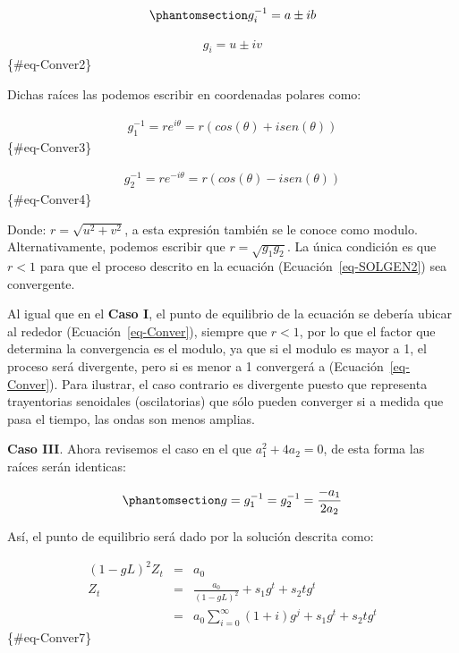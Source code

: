\documentclass[
  a4paper,
]{article}
\begin{document}
\begin{equation}\phantomsection\label{eq-Conver1}{
g_i^{-1}=a \pm ib
}\end{equation}

\begin{eqnarray}
    g_i  =  u \pm iv 
\end{eqnarray} \{\#eq-Conver2\}

Dichas raíces las podemos escribir en coordenadas polares como:

\begin{eqnarray}
    g_1^{-1} = r e^{i \theta} = r (cos(\theta) + i sen(\theta))
\end{eqnarray} \{\#eq-Conver3\}

\begin{eqnarray}
    g_2^{-1}  =  r e^{-i \theta} = r (cos(\theta) - i sen(\theta))
\end{eqnarray} \{\#eq-Conver4\}

Donde: \(r = \sqrt{u^2 + v^2}\), a esta expresión también se le conoce
como modulo. Alternativamente, podemos escribir que
\(r = \sqrt{g_1 g_2}\). La única condición es que \(r < 1\) para que el
proceso descrito en la ecuación (Ecuación~\ref{eq-SOLGEN2}) sea
convergente.

Al igual que en el \textbf{Caso I}, el punto de equilibrio de la
ecuación se debería ubicar al rededor (Ecuación~\ref{eq-Conver}),
siempre que \(r < 1\), por lo que el factor que determina la
convergencia es el modulo, ya que si el modulo es mayor a 1, el proceso
será divergente, pero si es menor a 1 convergerá a
(Ecuación~\ref{eq-Conver}). Para ilustrar, el caso contrario es
divergente puesto que representa trayentorias senoidales (oscilatorias)
que sólo pueden converger si a medida que pasa el tiempo, las ondas son
menos amplias.

\textbf{Caso III}. Ahora revisemos el caso en el que
\(a_1^2 + 4a_2 = 0\), de esta forma las raíces serán identicas:

\begin{equation}\phantomsection\label{eq-Conver6}{
    g = g_1^{-1} = g_2^{-1} = \frac{-a_1}{2 a_2}
}\end{equation}

Así, el punto de equilibrio será dado por la solución descrita como:

\begin{eqnarray}
    (1 - g L)^2 Z_t & = & a_0 \nonumber \\
    Z_t & = & \frac{a_0}{(1 - g L)^2} + s_1 g^t + s_2 t g^t \nonumber \\
    & = & a_0 \sum_{i = 0}^{\infty} (1 + i) g^j + s_1 g^t + s_2 t g^t
\end{eqnarray} \{\#eq-Conver7\}
\end{document}
